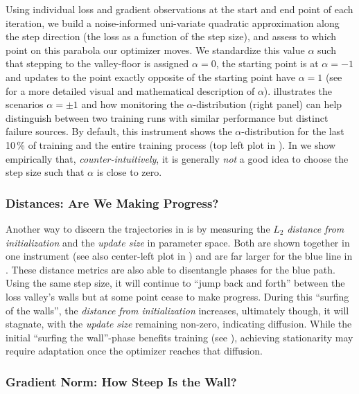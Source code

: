 Using individual loss and gradient observations at the start and end point of
each iteration, we build a noise-informed uni-variate quadratic approximation
along the step direction (\ie the loss as a function of the step size), and
assess to which point on this parabola our optimizer moves. We standardize this
value $\alpha$ such that stepping to the valley-floor is assigned $\alpha=0$,
the starting point is at $\alpha=-1$ and updates to the point exactly opposite
of the starting point have $\alpha=1$ (see  for a more
detailed visual and mathematical description of $\alpha$).
 illustrates the scenarios $\alpha=\pm1$ and how
monitoring the $\alpha$-distribution (right panel) can help distinguish between
two training runs with similar performance but distinct failure sources. By
default, this \cockpit instrument shows the $\alpha$-distribution for the last
10\,\% of training and the entire training process (top left plot in
). In  we show
empirically that, \emph{counter-intuitively}, it is generally \emph{not} a good
idea to choose the step size such that $\alpha$ is close to zero.

\subsubsection{Distances: Are We Making Progress?}

Another way to discern the trajectories in  is by
measuring the $L_2$ \textit{distance from initialization}
\citep{nagarajan2019generalization} and the \textit{update size}
\citep{agrawal2020investigating,frankle2020early} in parameter space. Both are
shown together in one \cockpit instrument (see also center-left plot in
) and are far larger for the blue line in
. These distance metrics are also able to disentangle
phases for the blue path. Using the same step size, it will continue to ``jump
back and forth'' between the loss valley's walls but at some point cease to make
progress. During this ``surfing of the walls'', the \textit{distance from
  initialization} increases, ultimately though, it will stagnate, with the
\textit{update size} remaining non-zero, indicating diffusion. While the initial
``surfing the wall''-phase benefits training (see
), achieving stationarity may require adaptation
once the optimizer reaches that diffusion.

\subsubsection{Gradient Norm: How Steep Is the Wall?}

